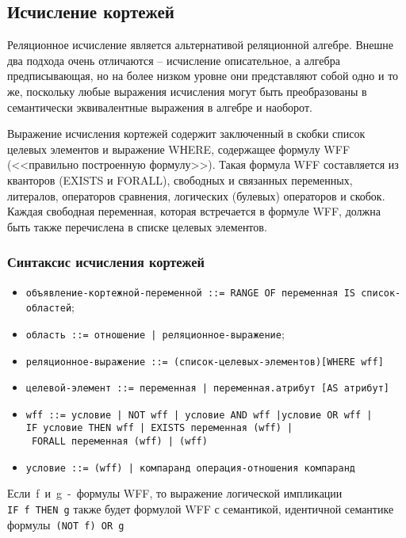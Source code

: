 \subsection*{Исчисление кортежей}

Реляционное исчисление является альтернативой реляционной алгебре. 
Внешне два подхода очень отличаются – исчисление описательное, а алгебра предписывающая, но на более низком уровне они представляют собой одно и то же, поскольку любые выражения исчисления могут быть преобразованы в семантически эквивалентные выражения в алгебре и наоборот.

Выражение исчисления кортежей содержит заключенный в скобки список целевых элементов и выражение WНERE, содержащее формулу WFF (<<правильно построенную формулу>>). 
Такая формула WFF составляется из кванторов (EXISTS и FORALL), свободных и связанных переменных, литералов, операторов сравнения, логических (булевых) операторов и скобок. 
Каждая свободная переменная, которая встречается в формуле WFF, должна быть также перечислена в списке целевых элементов.

\subsubsection*{Синтаксис исчисления кортежей}

\begin{itemize}[label*=--]
	\item \texttt{объявление-кортежной-переменной ::= RANGE OF переменная IS список-областей};
	\item \texttt{область ::= отношение | реляционное-выражение};
	\item \texttt{реляционное-выражение ::= (список-целевых-элементов)[WHERE wff]}
	\item \texttt{целевой-элемент ::= переменная | переменная.атрибут [AS атрибут]}

\clearpage

	\item \texttt{wff ::= условие | NOT wff | условие AND wff |условие OR wff | IF условие THEN wff | EXISTS переменная (wff) | \\ FORALL переменная (wff) | (wff)}
	\item \texttt{условие ::= (wff) | компаранд операция-отношения компаранд}
\end{itemize}

Если f и g - формулы WFF, то выражение логической импликации \texttt{IF f TНEN g} также будет формулой WFF с семантикой, идентичной семантике формулы \texttt{(NOT f) OR g}

